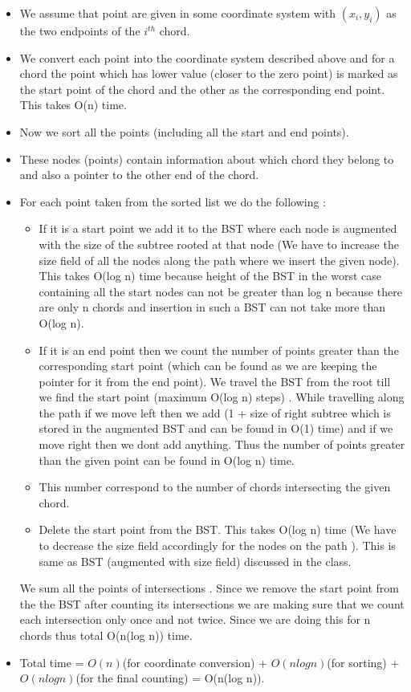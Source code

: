 \documentclass[11pt]{article}
\begin{document}
\begin{itemize}
\item We assume that point are given in some coordinate system with $(x_i,y_i)$ as the two endpoints of the $i^{th}$ chord.
\item We convert each point into the coordinate system described above and for a chord the point which has lower value (closer to the zero point) is marked as the start point of the chord and the other as the corresponding end point.
This takes O(n) time.
\item Now we sort all the points (including all the start and end points).
\item These nodes (points) contain information about which chord they belong to and also a pointer to the other end of the chord. 
\item For each point taken from the sorted list we do the following :
	\begin{itemize}
	\item If it is a start point we add it to the BST where each node is augmented with the size of the subtree rooted at that node (We have to increase the size field of all the nodes along the path where we insert the given node). This takes O(log n) time because height of the BST in the worst case containing all the start nodes can not be greater than log n because there are only n chords and insertion in such a BST can not take more than O(log n).
	\item If it is an end point then we count the number of points greater than the corresponding start point (which can be found as we are keeping the pointer for it from the end point). We travel the BST from the root till we find the start point (maximum O(log n) steps) . While travelling along the path if we move left then we add (1 + size of right subtree which is stored in the augmented BST and can be found in O(1) time) and if we move right then we dont add anything. Thus the number of points greater than the given point can be found in O(log n) time. 
    \item This number correspond to the number of chords intersecting the given chord.
    \item Delete the start point from the BST. This takes O(log n) time (We have to decrease the size field accordingly for the nodes on the path ). This is same as BST (augmented with size field) discussed in the class.
	\end{itemize}
	We sum all the points of intersections . Since we remove the start point from the the BST after counting its intersections we are making sure that we count each intersection only once and not twice. 
	Since we are doing this for n chords thus total O(n(log n)) time. 
\item Total time = $O(n)$(for coordinate conversion) + $O(nlog n)$(for sorting) + $O(nlog n)$(for the final counting) = O(n(log n)).
\end{itemize}
\end{document}

